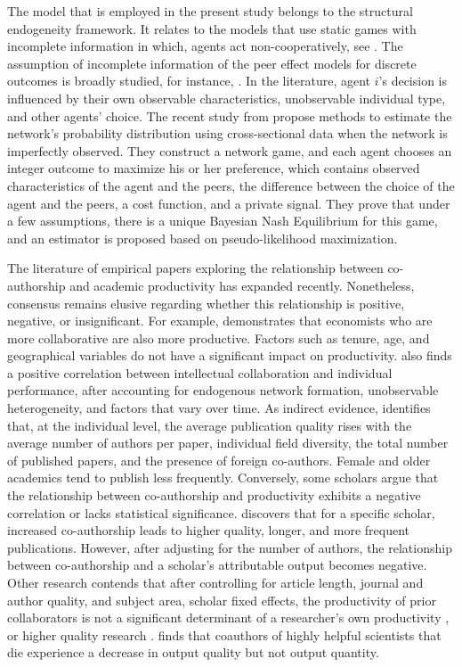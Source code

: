 The model that is employed in the present study belongs to the structural endogeneity framework. It relates to the models that use static games with incomplete information in which, agents act non-cooperatively, see \cite{harsanyi1967games, osborne1994course}. The assumption of incomplete information of the peer effect models for discrete outcomes is broadly studied, for instance, \cite{brock2001discrete, bajari2010estimating, yang2017social, de2017econometrics}. In the literature, agent $i$’s decision is influenced by their own observable characteristics, unobservable individual type, and other agents’ choice. The recent study from \cite{boucher2020estimating, houndetoungan2022count} propose methods to estimate the network’s probability distribution using cross-sectional data when the network is imperfectly observed. They construct a network game, and each agent chooses an integer outcome to maximize his or her preference, which contains observed characteristics of the agent and the peers, the difference between the choice of the agent and the peers, a cost function, and a private signal. They prove that under a few assumptions, there is a unique Bayesian Nash Equilibrium for this game, and an estimator is proposed based on pseudo-likelihood maximization.

The literature of empirical papers exploring the relationship between co-authorship and academic productivity has expanded recently. Nonetheless, consensus remains elusive regarding whether this relationship is positive, negative, or insignificant. For example, \cite{cainelli2015strength} demonstrates that economists who are more collaborative are also more productive. Factors such as tenure, age, and geographical variables do not have a significant impact on productivity. \cite{ductor2015does} also finds a positive correlation between intellectual collaboration and individual performance, after accounting for endogenous network formation, unobservable heterogeneity, and factors that vary over time. As indirect evidence, \cite{bosquet2013large} identifies that, at the individual level, the average publication quality rises with the average number of authors per paper, individual field diversity, the total number of published papers, and the presence of foreign co-authors. Female and older academics tend to publish less frequently. Conversely, some scholars argue that the relationship between co-authorship and productivity exhibits a negative correlation or lacks statistical significance. \cite{hollis2001co} discovers that for a specific scholar, increased co-authorship leads to higher quality, longer, and more frequent publications. However, after adjusting for the number of authors, the relationship between co-authorship and a scholar's attributable output becomes negative. Other research contends that after controlling for article length, journal and author quality, and subject area, scholar fixed effects, the productivity of prior collaborators is not a significant determinant of a researcher’s own productivity \cite{cheng2022productivity}, or higher quality research \cite{medoff2003collaboration}. \cite{oettl2012reconceptualizing} finds that coauthors of highly helpful scientists that die experience a decrease in output quality but not output quantity.

